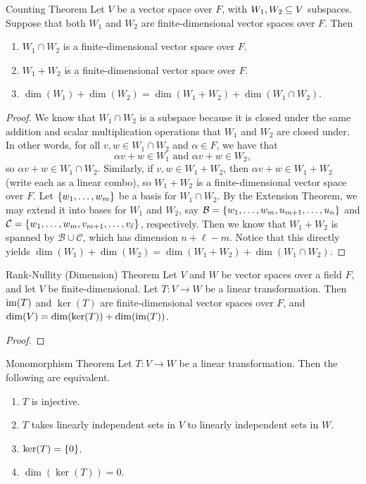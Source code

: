 \documentclass[class=article, crop=false]{standalone}
\begin{document}
  \newpage
  \begin{theorem}{Counting Theorem}
    Let $V$ be a vector space over $F$, with $W_1,W_2\subseteq V$ subspaces. Suppose that both $W_1$ and $W_2$ are finite-dimensional vector spaces over $F$. Then
    \begin{enumerate}[label=(\alph*)]
      \item $W_1\cap W_2$ is a finite-dimensional vector space over $F$.
      \item $W_1 + W_2$ is a finite-dimensional vector space over $F$.
      \item $\dim(W_1) + \dim(W_2) = \dim(W_1 + W_2) + \dim(W_1\cap W_2)$.
    \end{enumerate}
  \end{theorem}
  \begin{proof}
    We know that $W_1\cap W_2$ is a subspace because it is closed under the same addition and scalar multiplication operations that $W_1$ and $W_2$ are closed under. In other words, for all $v, w\in W_1\cap W_2$ and $\alpha\in F$, we have that
    \[
      \alpha v + w\in W_1 \text{ and } \alpha v + w\in W_2,
    \]
    so $\alpha v + w\in W_1\cap W_2$. Similarly, if $v, w\in W_1 + W_2$, then $\alpha v + w\in W_1 + W_2$ (write each as a linear combo), so $W_1 + W_2$ is a finite-dimensional vector space over $F$. Let $\left\{w_1,\dotsc,w_m\right\}$ be a basis for $W_1\cap W_2$. By the Extension Theorem, we may extend it into bases for $W_1$ and $W_2$, say $\mathcal{B} = \left\{w_1,\dotsc,w_m,u_{m+1},\dotsc,u_n\right\}$ and $\mathcal{C} = \left\{w_1,\dotsc,w_m,v_{m+1},\dotsc,v_\ell\right\}$, respectively. Then we know that $W_1 + W_2$ is spanned by $\mathcal{B}\cup \mathcal{C}$, which has dimension $n + \ell - m$. Notice that this directly yields $\dim(W_1) + \dim(W_2) = \dim(W_1 + W_2) + \dim(W_1\cap W_2)$.
  \end{proof}
  \newpage
  \begin{theorem}{Rank-Nullity (Dimension) Theorem}
    Let $V$ and $W$ be vector spaces over a field $F$, and let $V$ be finite-dimensional. Let $T\colon V\to W$ be a linear transformation. Then $\operatorname{im}(T)$ and $\ker(T)$ are finite-dimensional vector spaces over $F$, and $\dim(V) = \dim(\ker(T)) + \dim(\operatorname{im}(T))$.
  \end{theorem}
  \begin{proof}
    
  \end{proof}
  \begin{theorem}{Monomorphism Theorem}
    Let $T\colon V\to W$ be a linear transformation. Then the following are equivalent.
    \begin{enumerate}[label=(\alph*)]
      \item $T$ is injective.
      \item $T$ takes linearly independent sets in $V$ to linearly independent sets in $W$.
      \item $\ker(T) = \left\{0\right\}$.
      \item $\dim(\ker(T)) = 0$.
    \end{enumerate}
  \end{theorem}
\end{document}
